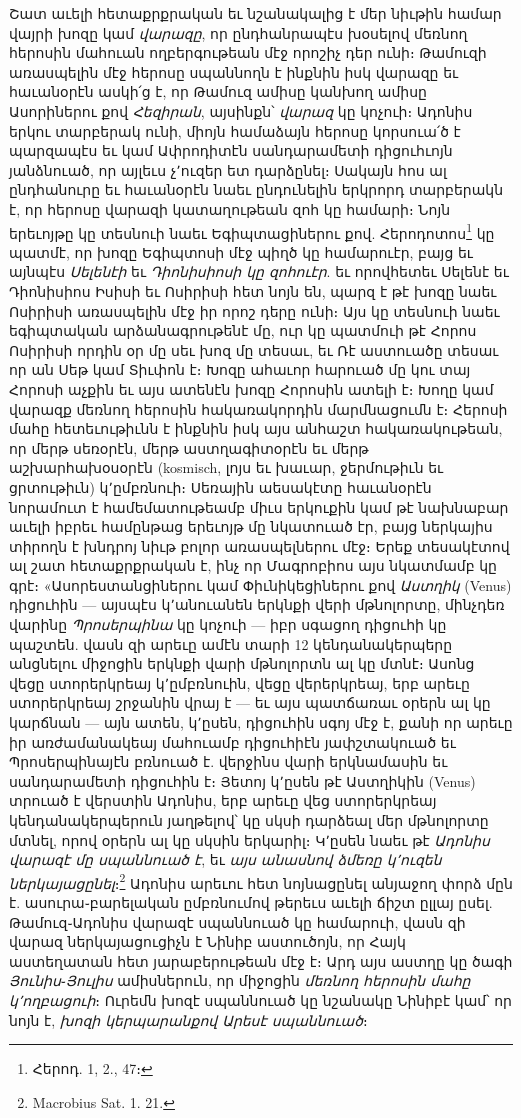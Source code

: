 \documentclass{article}
\begin{document}
{Շատ աւելի հետաքրքրական եւ նշանակալից է մեր նիւթին համար վայրի խոզը կամ \emph{վարազը}, որ ընդհանրապէս խօսելով մեռնող հերոսին մահուան ողբերգութեան մէջ որոշիչ դեր ունի։ Թամուզի առասպելին մէջ հերոսը սպաննողն է ինքնին իսկ վարազը եւ հաւանօրէն ասկի՛ց է, որ Թամուզ ամիսը կանխող ամիսը Ասորիներու քով \emph{Հեզիրան}, այսինքն՝ \emph{վարազ} կը կոչուի։ Ադոնիս երկու տարբերակ ունի, միոյն համաձայն հերոսը կորսուա՛ծ է պարզապէս եւ կամ Ափրոդիտէն սանդարամետի դիցուհւոյն յանձնուած, որ այլեւս չ՚ուզեր ետ դարձընել։ Սակայն հոս ալ ընդհանուրը եւ հաւանօրէն նաեւ ընդունելին երկրորդ տարբերակն է, որ հերոսը վարազի կատաղութեան զոհ կը համարի։ Նոյն երեւոյթը կը տեսնուի նաեւ Եգիպտացիներու քով. Հերոդոտոս\footnote{Հերոդ. 1, 2., 47։} կը պատմէ, որ խոզը Եգիպտոսի մէջ պիղծ կը համարուէր, բայց եւ այնպէս \emph{Սելենէի} եւ \emph{Դիոնիսիոսի կը զոհուէր}. եւ որովհետեւ Սելենէ եւ Դիոնիսիոս Իսիսի եւ Ոսիրիսի հետ նոյն են, պարզ է թէ խոզը նաեւ Ոսիրիսի առասպելին մէջ իր որոշ դերը ունի։ Այս կը տեսնուի նաեւ եգիպտական արձանագրութենէ մը, ուր կը պատմուի թէ Հորոս Ոսիրիսի որդին օր մը սեւ խոզ մը տեսաւ, եւ Ռէ աստուածը տեսաւ որ ան Սեթ կամ Տիւփոն է։ Խոզը ահաւոր հարուած մը կու տայ Հորոսի աչքին եւ այս ատենէն խոզը Հորոսին ատելի է։ Խողը կամ վարազք մեռնող հերոսին հակառակորդին մարմնացումն է։ Հերոսի մահը հետեւութիւնն է ինքնին իսկ այս անհաշտ հակառակութեան, որ մերթ սեռօրէն, մերթ աստղագիտօրէն եւ մերթ աշխարհախօսօրէն (kosmisch, լոյս եւ խաւար, ջերմութիւն եւ ցրտութիւն) կ՚ըմբռնուի։ Սեռային աեսակէտը հաւանօրէն նորամուտ է համեմատութեամբ միւս երկուքին կամ թէ նախնաբար աւելի իբրեւ համընթաց երեւոյթ մը նկատուած էր, բայց ներկայիս տիրողն է խնդրոյ նիւթ բոլոր առասպելներու մէջ։ Երեք տեսակէտով ալ շատ հետաքրքրական է, ինչ որ Մագրոբիոս այս նկատմամբ կը գրէ։ «Ասորեստանցիներու կամ Փիւնիկեցիներու քով \emph{Աստղիկ} (Venus) դիցուհին — այսպէս կ՚անուանեն երկնքի վերի մթնոլորտը, մինչդեռ վարինը \emph{Պրոսերպինա} կը կոչուի — իբր սգացող դիցուհի կը պաշտեն. վասն զի արեւը ամէն տարի 12 կենդանակերպերը անցնելու միջոցին երկնքի վարի մթնոլորտն ալ կը մտնէ։ Ասոնց վեցը ստորերկրեայ կ՚ըմբռնուին, վեցը վերերկրեայ, երբ արեւը ստորերկրեայ շրջանին վրայ է — եւ այս պատճառաւ օրերն ալ կը կարճնան — այն ատեն, կ՚ըսեն, դիցուհին սգոյ մէջ է, քանի որ արեւը իր առժամանակեայ մահուամբ դիցուհիէն յափշտակուած եւ Պրոսերպինայէն բռնուած է. վերջինս վարի երկնամասին եւ սանդարամետի դիցուհին է։ Յետոյ կ՚ըսեն թէ Աստղիկին (Venus) տրուած է վերստին Ադոնիս, երբ արեւը վեց ստորերկրեայ կենդանակերպերուն յաղթելով՝ կը սկսի դարձեալ մեր մթնոլորտը մտնել, որով օրերն ալ կը սկսին երկարիլ։ Կ՚ըսեն նաեւ թէ \emph{Ադոնիս վարազէ մը սպաննուած է}, եւ \emph{այս անասնով ձմեռը կ՚ուզեն ներկայացընել}։\footnote{Macrobius Sat. 1. 21.} Ադոնիս արեւու հետ նոյնացընել անյաջող փորձ մըն է. ասուրա֊բարելական ըմբռնումով թերեւս աւելի ճիշտ ըլլայ ըսել. Թամուզ֊Ադոնիս վարազէ սպաննուած կը համարուի, վասն զի վարազ ներկայացուցիչն է Նինիբ աստուծոյն, որ Հայկ աստեղատան հետ յարաբերութեան մէջ է։ Արդ այս աստղը կը ծագի \emph{Յունիս}֊\emph{Յուլիս} ամիսներուն, որ միջոցին \emph{մեռնող հերոսին մահը կ՚ողբացուի}։ Ուրեմն խոզէ սպաննուած կը նշանակը Նինիբէ կամ՝ որ նոյն է, \emph{խոզի կերպարանքով Արեսէ սպաննուած}։

}
\end{document}
